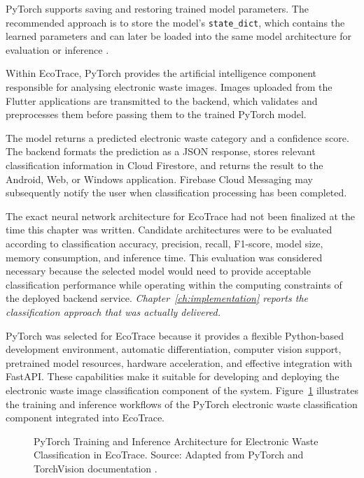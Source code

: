 PyTorch supports saving and restoring trained model parameters. The
recommended approach is to store the model's \texttt{state\_dict}, which contains
the learned parameters and can later be loaded into the same model architecture
for evaluation or inference \citep{pytorch2026saving}.

Within EcoTrace, PyTorch provides the artificial intelligence component
responsible for analysing electronic waste images. Images uploaded from the
Flutter applications are transmitted to the backend, which validates and
preprocesses them before passing them to the trained PyTorch model.

The model returns a predicted electronic waste category and a confidence
score. The backend formats the prediction as a JSON response, stores relevant
classification information in Cloud Firestore, and returns the result to the
Android, Web, or Windows application. Firebase Cloud Messaging may
subsequently notify the user when classification processing has been completed.

The exact neural network architecture for EcoTrace had not been finalized at
the time this chapter was written. Candidate architectures were to be evaluated
according to classification accuracy, precision, recall, F1-score, model size,
memory consumption, and inference time. This evaluation was considered
necessary because the selected model would need to provide acceptable
classification performance while operating within the computing constraints of
the deployed backend service. \textit{Chapter~\ref{ch:implementation} reports the
classification approach that was actually delivered.}

PyTorch was selected for EcoTrace because it provides a flexible Python-based
development environment, automatic differentiation, computer vision support,
pretrained model resources, hardware acceleration, and effective integration with
FastAPI. These capabilities make it suitable for developing and deploying the
electronic waste image classification component of the system.
Figure~\ref{fig:pytorch-arch} illustrates the training and inference workflows of
the PyTorch electronic waste classification component integrated into EcoTrace.

\begin{figure}[H]
  \centering
  \caption{PyTorch Training and Inference Architecture for Electronic Waste Classification in EcoTrace. Source: Adapted from PyTorch and TorchVision documentation \citep{pytorch2026docs,pytorch2026torchvision}.}
  \label{fig:pytorch-arch}
\end{figure}

